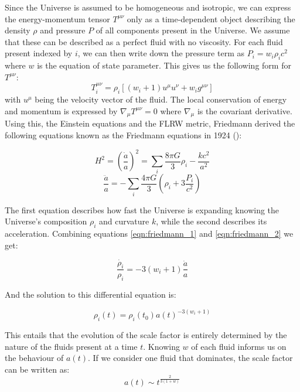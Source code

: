 Since the Universe is assumed to be homogeneous and isotropic, we can express the energy-momentum tensor $T^{\mu \nu}$ only as a time-dependent object describing the density $\rho$ and pressure 
$P$ of all components present in the Universe. We assume that these can be described as a perfect fluid with no viscosity. For each fluid present indexed by $i$, we can then write down the pressure 
term as $P_i=w_i\rho_i c^2$ where $w$ is the equation of state parameter. This gives us the following form for $T^{\mu \nu}$:
\begin{equation}
    T^{\mu \nu}_i = \rho_i \left[ (w_i+1)u^{\mu}u^{\nu} + w_ig^{\mu \nu} \right]
    \label{eqn:T_mu_nu}
\end{equation}
with $u^{\mu}$ being the velocity vector of the fluid. The local conservation of energy and momentum is expressed by $\nabla_{\mu} T^{\mu \nu} =0 $ where $\nabla_{\mu}$ is the covariant derivative. \\

Using this, the Einstein equations and the FLRW metric, Friedmann derived the following equations known as the Friedmann equations in 1924 (\cite{Friedmann_1922, Friedmann_1924}): 

\begin{equation}
    H^2 = \left( \frac{\dot{a}}{a} \right)^2 = \sum_i \frac{8 \pi G}{3}\rho_i - \frac{kc^2}{a^2}
    \label{eqn:friedmann_1}
\end{equation}
\begin{equation}
    \frac{\ddot{a}}{a} = - \sum_i\frac{4\pi G}{3}\left(\rho_i + 3 \frac{P_i}{c^2}\right)
    \label{eqn:friedmann_2}
\end{equation}

The first equation describes how fast the Universe is expanding knowing the Universe's composition $\rho_i$ and curvature $k$, while the second describes its acceleration.
Combining equations \ref{eqn:friedmann_1} and \ref{eqn:friedmann_2} we get:

\begin{equation}
    \frac{\dot{\rho_i}}{\rho_i} = -3(w_i+1)\frac{\dot{a}}{a}
\end{equation}

And the solution to this differential equation is:

\begin{equation}
    \boxed{\rho_i(t) = \rho_i(t_0)a(t)^{-3(w_i+1)}}
\end{equation}

This entails that the evolution of the scale factor is entirely determined by the nature of the fluids present at a time $t$. Knowing $w$ of each fluid informs us on the behaviour of 
$a(t)$. If we consider one fluid that dominates, the scale factor can be written as:
\begin{equation}
    a(t) \sim t^{\frac{2}{3(1+w)}}
\end{equation}

